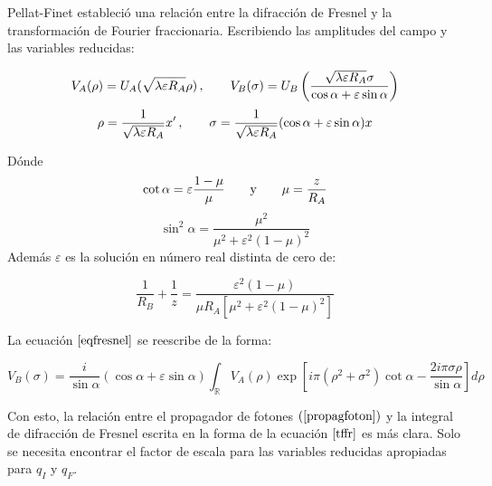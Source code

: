     Pellat-Finet estableció una relación entre la difracción de Fresnel y la transformación de Fourier fraccionaria. Escribiendo las amplitudes del campo y las variables reducidas:
    
    \begin{equation}
        V_{A}(\rho) = U_{A}(\sqrt{\lambda \varepsilon R_{A}}\rho)\, ,\hspace{0.7cm} 
        V_{B}(\sigma) = U_{B}\left ( \frac{\sqrt{\lambda \varepsilon R_{A}}\sigma}{\cos \alpha + \varepsilon \sin \alpha} \right )
    \end{equation}
    \begin{equation}        
        \rho = \frac{1}{\sqrt{\lambda \varepsilon R_{A}}}x'\, ,\hspace{0.7cm}
        \sigma = \frac{1}{\sqrt{\lambda \varepsilon R_{A}}}(\cos \alpha + \varepsilon \sin \alpha)x
        \label{variablered}
    \end{equation}
    
    Dónde 
    \begin{equation}
        \cot \alpha = \varepsilon \frac{1-\mu}{\mu}\hspace{0.7cm} \mathrm{y} \hspace{0.7cm} \mu = \frac{z}{R_{A}}
        \label{eqcot}
    \end{equation}
    \begin{equation}
        \sin ^{2} \alpha = \frac{\mu ^{2}}{\mu ^{2} + \varepsilon ^{2} (1-\mu)^{2}}
        \label{eqsin}
    \end{equation}
    Además $\varepsilon$ es la solución en número real distinta de cero de:
    
    \begin{equation}
        \frac{1}{R_{B}} + \frac{1}{z} = \frac{\varepsilon^{2}(1-\mu)}{\mu R_{A}[\mu^{2} + \varepsilon^{2}(1-\mu)^{2}]}
        \label{eqradios}
    \end{equation}
    
    La ecuación $\ref{eqfresnel}$ se reescribe de la forma:
    
    \begin{equation}
        V_{B}(\sigma) = \frac{i}{\sin\alpha} (\cos \alpha + \varepsilon \sin \alpha) \int_{\mathbb{R}} V_{A}(\rho) \exp \left [ i\pi (\rho^{2}+ \sigma^{2})\cot \alpha - \frac{2i\pi \sigma \rho}{\sin \alpha} \right ] d\rho
        \label{tffr}
    \end{equation}
    
    Con esto, la relación entre el propagador de fotones $(\ref{propagfoton})$ y la integral de difracción de Fresnel escrita en la forma de la ecuación $\ref{tffr}$ es más clara. Solo se necesita encontrar el factor de escala para las variables reducidas apropiadas para $q_{I}$ y $q_{F}$.
    
